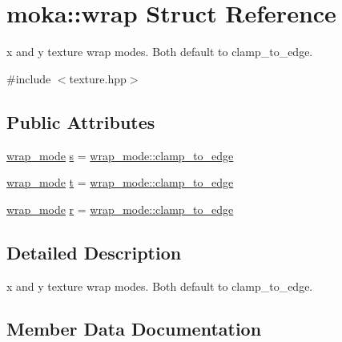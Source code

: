 \hypertarget{structmoka_1_1wrap}{}\section{moka\+::wrap Struct Reference}
\label{structmoka_1_1wrap}


x and y texture wrap modes. Both default to clamp\+\_\+to\+\_\+edge.  




{\ttfamily \#include $<$texture.\+hpp$>$}

\subsection*{Public Attributes}
\begin{DoxyCompactItemize}
\item 
\mbox{\hyperlink{namespacemoka_afda3faa87bacaacc6008d8c1f73f6462}{wrap\+\_\+mode}} \mbox{\hyperlink{structmoka_1_1wrap_a703a73b99bf23cc13a933f553c17e7a6}{s}} = \mbox{\hyperlink{namespacemoka_afda3faa87bacaacc6008d8c1f73f6462a7ff5ead6fef18ca5f63119754ac76c3e}{wrap\+\_\+mode\+::clamp\+\_\+to\+\_\+edge}}
\item 
\mbox{\hyperlink{namespacemoka_afda3faa87bacaacc6008d8c1f73f6462}{wrap\+\_\+mode}} \mbox{\hyperlink{structmoka_1_1wrap_aba660a44454afab7048d2b79a6e68f35}{t}} = \mbox{\hyperlink{namespacemoka_afda3faa87bacaacc6008d8c1f73f6462a7ff5ead6fef18ca5f63119754ac76c3e}{wrap\+\_\+mode\+::clamp\+\_\+to\+\_\+edge}}
\item 
\mbox{\hyperlink{namespacemoka_afda3faa87bacaacc6008d8c1f73f6462}{wrap\+\_\+mode}} \mbox{\hyperlink{structmoka_1_1wrap_a29d90521beacc7728eaf074b26a68a36}{r}} = \mbox{\hyperlink{namespacemoka_afda3faa87bacaacc6008d8c1f73f6462a7ff5ead6fef18ca5f63119754ac76c3e}{wrap\+\_\+mode\+::clamp\+\_\+to\+\_\+edge}}
\end{DoxyCompactItemize}


\subsection{Detailed Description}
x and y texture wrap modes. Both default to clamp\+\_\+to\+\_\+edge. 

\subsection{Member Data Documentation}
\mbox{\label{structmoka_1_1wrap_a29d90521beacc7728eaf074b26a68a36}} 
